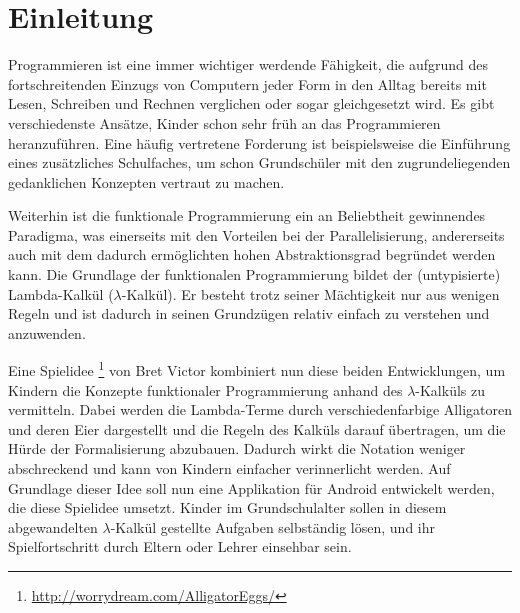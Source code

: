\section{Einleitung}

Programmieren ist eine immer wichtiger werdende Fähigkeit, die aufgrund des fortschreitenden Einzugs von Computern jeder Form in den Alltag bereits mit Lesen, Schreiben und Rechnen verglichen oder sogar gleichgesetzt wird.
Es gibt verschiedenste Ansätze, Kinder schon sehr früh an das Programmieren heranzuführen.
Eine häufig vertretene Forderung ist beispielsweise die Einführung eines zusätzliches Schulfaches, um schon Grundschüler mit den zugrundeliegenden gedanklichen Konzepten vertraut zu machen.

Weiterhin ist die funktionale Programmierung ein an Beliebtheit gewinnendes Paradigma,
was einerseits mit den Vorteilen bei der Parallelisierung, andererseits auch mit dem dadurch ermöglichten hohen Abstraktionsgrad begründet werden kann.
Die Grundlage der funktionalen Programmierung bildet der (untypisierte) Lambda-Kalkül (\(\lambda\)-Kalkül).
Er besteht trotz seiner Mächtigkeit nur aus wenigen Regeln und ist dadurch in seinen Grundzügen relativ einfach zu verstehen und anzuwenden.


Eine Spielidee \footnote{\url{http://worrydream.com/AlligatorEggs/}} von Bret Victor kombiniert nun diese beiden Entwicklungen, um Kindern die Konzepte funktionaler Programmierung anhand des \(\lambda\)-Kalküls zu vermitteln.
Dabei werden die Lambda-Terme durch verschiedenfarbige Alligatoren und deren Eier dargestellt und die Regeln des Kalküls darauf übertragen, um die Hürde der Formalisierung abzubauen.
Dadurch wirkt die Notation weniger abschreckend und kann von Kindern einfacher verinnerlicht werden.
Auf Grundlage dieser Idee soll nun eine Applikation für Android entwickelt werden, die diese Spielidee umsetzt.
Kinder im Grundschulalter sollen in diesem abgewandelten \(\lambda\)-Kalkül gestellte Aufgaben selbständig lösen, und ihr Spielfortschritt durch Eltern oder Lehrer einsehbar sein.
